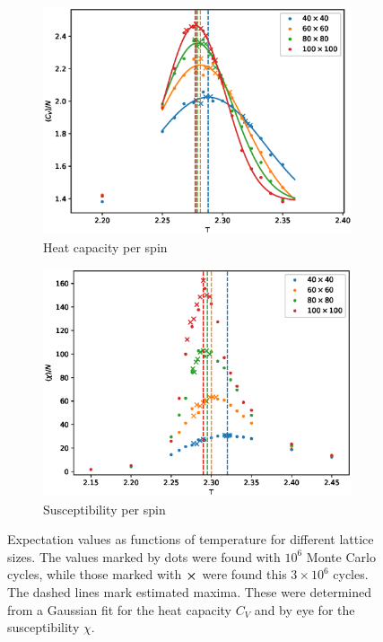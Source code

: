 \documentclass[a4paper,10pt,onecolumn]{article}
\newcommand{\ee}[1]{\!\times\!\!10^{#1}} 	%
\begin{document}
\begin{figure}
\begin{subfigure}{0.5\linewidth}
		\includegraphics[width=\linewidth]{heatcapacity.eps}
		\caption{Heat capacity per spin}
		\label{fig:C}
	\end{subfigure}%
	\begin{subfigure}{0.5\linewidth}
		\centering
		\includegraphics[width=\linewidth]{susceptibility.eps}
		\caption{Susceptibility per spin}
		\label{fig:X}
	\end{subfigure}
	\caption{Expectation values as functions of temperature for different lattice sizes. The values marked by dots were found with $10^6$ Monte Carlo cycles, while those marked with $\cross$ were found this $3\ee{6}$ cycles. The dashed lines mark estimated maxima. These were determined from a Gaussian fit for the heat capacity $C_V$ and by eye for the susceptibility $\chi$.}
	\label{fig:exp}
\end{figure}
\end{document}
